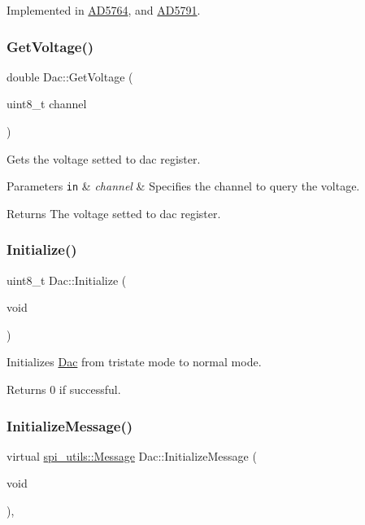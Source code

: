Implemented in \mbox{\hyperlink{classAD5764_a729015992eda059ae615373d1db53823}{A\+D5764}}, and \mbox{\hyperlink{classAD5791_ab1f3eef8afe6989d9981bb29ddec9ec5}{A\+D5791}}.

\mbox{\label{classDac_ad51bf5450f03f39a0357398af69f1705}} 
\subsubsection{\texorpdfstring{Get\+Voltage()}{GetVoltage()}}
{\footnotesize\ttfamily double Dac\+::\+Get\+Voltage (\begin{DoxyParamCaption}\item[{uint8\+\_\+t}]{channel }\end{DoxyParamCaption})}

Gets the voltage setted to dac register. 
\begin{DoxyParams}[1]{Parameters}
\mbox{\tt in}  & {\em channel} & Specifies the channel to query the voltage. \\
\hline
\end{DoxyParams}
\begin{DoxyReturn}{Returns}
The voltage setted to dac register. 
\end{DoxyReturn}
\mbox{\label{classDac_aea1f5f36c9371ebc1527e848ce67e47a}} 
\subsubsection{\texorpdfstring{Initialize()}{Initialize()}}
{\footnotesize\ttfamily uint8\+\_\+t Dac\+::\+Initialize (\begin{DoxyParamCaption}\item[{void}]{ }\end{DoxyParamCaption})}

Initializes \mbox{\hyperlink{classDac}{Dac}} from tristate mode to normal mode. \begin{DoxyReturn}{Returns}
0 if successful. 
\end{DoxyReturn}
\mbox{\label{classDac_aa34ddd250cf830bba220b86d462785b5}} 
\subsubsection{\texorpdfstring{Initialize\+Message()}{InitializeMessage()}}
{\footnotesize\ttfamily virtual \mbox{\hyperlink{structspi__utils_1_1Message}{spi\+\_\+utils\+::\+Message}} Dac\+::\+Initialize\+Message (\begin{DoxyParamCaption}\item[{void}]{ }\end{DoxyParamCaption})\hspace{0.3cm}{\ttfamily [protected]}, {}}

